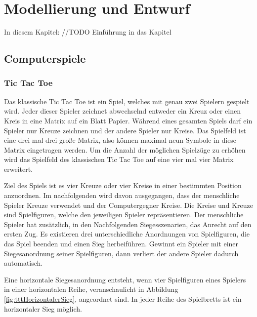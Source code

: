 \chapter{Modellierung und Entwurf}
\label{cha:mue}

In diesem Kapitel: //TODO Einführung in das Kapitel

\section{Computerspiele}
\label{sec:computerspiele}

\subsection{Tic Tac Toe}
\label{sec:ttt}

Das klassische Tic Tac Toe ist ein Spiel, welches mit genau zwei Spielern gespielt wird. Jeder dieser Spieler zeichnet abwechselnd entweder ein Kreuz oder einen Kreis in eine Matrix auf ein Blatt Papier. Während eines gesamten Spiels darf ein Spieler nur Kreuze zeichnen und der andere Spieler nur Kreise. Das Spielfeld ist eine drei mal drei große Matrix, also können maximal neun Symbole in diese Matrix eingetragen werden. Um die Anzahl der möglichen Spielzüge zu erhöhen wird das Spielfeld des klassischen Tic Tac Toe auf eine vier mal vier Matrix erweitert.


Ziel des Spiels ist es vier Kreuze oder vier Kreise in einer bestimmten Position anzuordnen. Im nachfolgenden wird davon ausgegangen, dass der menschliche Spieler Kreuze verwendet und der Computergegner Kreise. Die Kreise und Kreuze sind Spielfiguren, welche den jeweiligen Spieler repräsentieren. Der menschliche Spieler hat zusätzlich, in den Nachfolgenden Siegesszenarien, das Anrecht auf den ersten Zug. Es existieren drei unterschiedliche Anordnungen von Spielfiguren, die das Spiel beenden und einen Sieg herbeiführen. Gewinnt ein Spieler mit einer Siegesanordnung seiner Spielfiguren, dann verliert der andere Spieler dadurch automatisch.

Eine horizontale Siegesanordnung entsteht, wenn vier Spielfiguren eines Spielers in einer horizontalen Reihe, veranschaulicht in Abbildung \ref{fig:tttHorizontalerSieg}, angeordnet sind. In jeder Reihe des Spielbretts ist ein horizontaler Sieg möglich.

